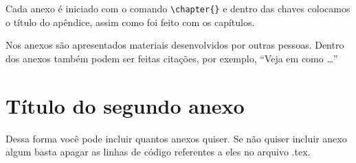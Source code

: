 \documentclass[12pt,a4paper,header]{abnt}
\begin{document}
Cada anexo é iniciado com o comando \verb|\chapter{}| e dentro das chaves colocamos o título do apêndice, assim como foi feito com os capítulos. 


Nos anexos são apresentados materiais desenvolvidos por outras pessoas. Dentro dos anexos também podem ser feitas citações, por exemplo, ``Veja em  como \ldots''



\chapter{Título do segundo anexo}
Dessa forma você pode incluir quantos anexos quiser. Se não quiser incluir anexo algum basta apagar as linhas de código referentes a eles no arquivo .tex. 
\end{document}
